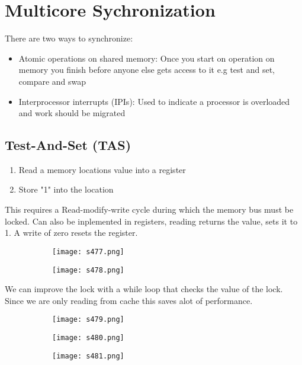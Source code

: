 \documentclass[8pt]{extreport}
\begin{document}
\section{Multicore Sychronization}

There are two ways to synchronize:
\begin{itemize}
\item Atomic operations on shared memory: Once you start on operation on memory you finish before anyone else gets access to it e.g test and set, compare and swap
\item Interprocessor interrupts (IPIs): Used to indicate a processor is overloaded and work should be migrated
\end{itemize}
\subsection{Test-And-Set (TAS)}
\begin{enumerate}
\item Read a memory locations value into a register
\item Store "1" into the location
\end{enumerate}
This requires a Read-modify-write cycle during which the memory bus must be locked. Can also be inplemented in registers, reading returns the value, sets it to 1. A write of zero resets the register.
 \begin{figure}[H]
\begin{subfigure}[b]{0.4\linewidth}
\texttt{[image: s477.png]}
\end{subfigure}
\begin{subfigure}[b]{0.4\linewidth}
\texttt{[image: s478.png]}
\end{subfigure}
\end{figure}
We can improve the lock with a while loop that checks the value of the lock. Since we are only reading from cache this saves alot of performance.
 \begin{figure}[H]
\begin{subfigure}[b]{0.4\linewidth}
\texttt{[image: s479.png]}
\end{subfigure}
\begin{subfigure}[b]{0.4\linewidth}
\texttt{[image: s480.png]}
\end{subfigure}
\begin{subfigure}[b]{0.4\linewidth}
\texttt{[image: s481.png]}
\end{subfigure}
\end{figure}
\end{document}
